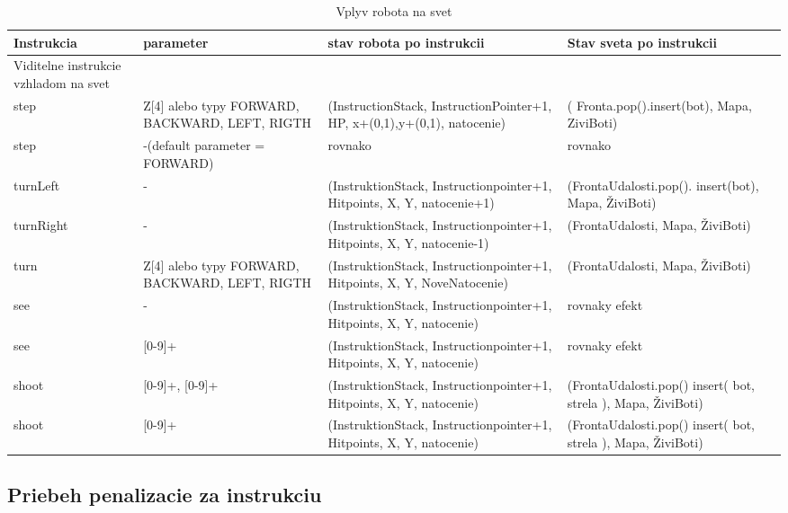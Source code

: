 \documentclass[a4paper,11pt,final]{report}
\begin{document}
\begin{table}[ht]
\caption{Vplyv robota na svet}   %
\centering                          %
\begin{tabular}{|p{3cm}|p{3cm}|p{4cm}|p{4cm}|}        
\hline\hline                        %
Instrukcia & parameter & stav robota po instrukcii & Stav sveta po instrukcii\\    %
\hline                              %
Viditelne instrukcie vzhladom na svet\\\hline
step & Z[4] alebo typy FORWARD, BACKWARD, LEFT, RIGTH & (InstructionStack, InstructionPointer+1, HP, x+(0,1),y+(0,1), natocenie) & ( Fronta.pop().insert(bot), Mapa, ZiviBoti)\\\hline
step & -(default parameter = FORWARD) & rovnako & rovnako\\\hline %
turnLeft & - & (InstruktionStack, Instructionpointer+1, Hitpoints, X, Y, natocenie+1)&(FrontaUdalosti.pop(). insert(bot), Mapa, ŽiviBoti)\\ \hline
turnRight  & - & (InstruktionStack, Instructionpointer+1, Hitpoints, X, Y, natocenie-1)&(FrontaUdalosti, Mapa, ŽiviBoti)\\\hline
turn  & Z[4] alebo typy FORWARD, BACKWARD, LEFT, RIGTH & (InstruktionStack, Instructionpointer+1, Hitpoints, X, Y, NoveNatocenie)&(FrontaUdalosti, Mapa, ŽiviBoti)\\\hline
see & - &  (InstruktionStack, Instructionpointer+1, Hitpoints, X, Y, natocenie) & rovnaky efekt\\\hline %
see & [0-9]+ &(InstruktionStack, Instructionpointer+1, Hitpoints, X, Y, natocenie)& rovnaky efekt \\\hline 
shoot & [0-9]+, [0-9]+ &(InstruktionStack, Instructionpointer+1, Hitpoints, X, Y, natocenie)& (FrontaUdalosti.pop() insert( bot, strela ), Mapa, ŽiviBoti) \\\hline 
shoot & [0-9]+ &(InstruktionStack, Instructionpointer+1, Hitpoints, X, Y, natocenie)& (FrontaUdalosti.pop() insert( bot, strela ), Mapa, ŽiviBoti) \\\hline 
\hline
\end{tabular}
\label{table:xx}          %
\end{table}

\subsection{Priebeh penalizacie za instrukciu}
\end{document}
